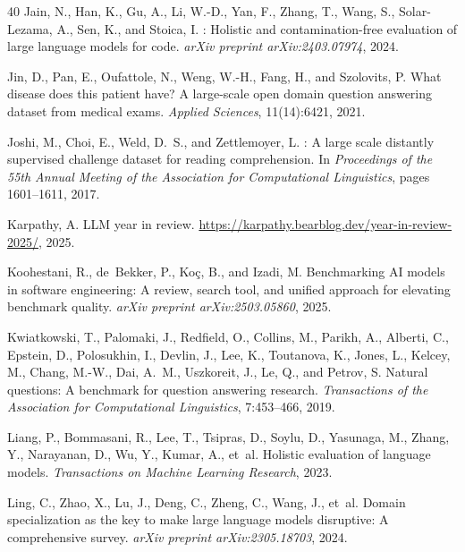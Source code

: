 \documentclass[11pt,a4paper]{article}
\begin{document}
\begin{thebibliography}{40}
Jain, N., Han, K., Gu, A., Li, W.-D., Yan, F., Zhang, T., Wang, S., Solar-Lezama, A., Sen, K., and Stoica, I.
: Holistic and contamination-free evaluation of large language models for code.
\newblock \emph{arXiv preprint arXiv:2403.07974}, 2024.

Jin, D., Pan, E., Oufattole, N., Weng, W.-H., Fang, H., and Szolovits, P.
\newblock What disease does this patient have? {A} large-scale open domain question answering dataset from medical exams.
\newblock \emph{Applied Sciences}, 11(14):6421, 2021.

Joshi, M., Choi, E., Weld, D.~S., and Zettlemoyer, L.
: A large scale distantly supervised challenge dataset for reading comprehension.
\newblock In \emph{Proceedings of the 55th Annual Meeting of the Association for Computational Linguistics}, pages 1601--1611, 2017.

Karpathy, A.
 {LLM} year in review.
\newblock \url{https://karpathy.bearblog.dev/year-in-review-2025/}, 2025.

Koohestani, R., de~Bekker, P., Ko\c{c}, B., and Izadi, M.
\newblock Benchmarking {AI} models in software engineering: A review, search tool, and unified approach for elevating benchmark quality.
\newblock \emph{arXiv preprint arXiv:2503.05860}, 2025.

Kwiatkowski, T., Palomaki, J., Redfield, O., Collins, M., Parikh, A., Alberti, C., Epstein, D., Polosukhin, I., Devlin, J., Lee, K., Toutanova, K., Jones, L., Kelcey, M., Chang, M.-W., Dai, A.~M., Uszkoreit, J., Le, Q., and Petrov, S.
\newblock Natural questions: A benchmark for question answering research.
\newblock \emph{Transactions of the Association for Computational Linguistics}, 7:453--466, 2019.

Liang, P., Bommasani, R., Lee, T., Tsipras, D., Soylu, D., Yasunaga, M., Zhang, Y., Narayanan, D., Wu, Y., Kumar, A., et~al.
\newblock Holistic evaluation of language models.
\newblock \emph{Transactions on Machine Learning Research}, 2023.

Ling, C., Zhao, X., Lu, J., Deng, C., Zheng, C., Wang, J., et~al.
\newblock Domain specialization as the key to make large language models disruptive: A comprehensive survey.
\newblock \emph{arXiv preprint arXiv:2305.18703}, 2024.


\end{thebibliography}
\end{document}

